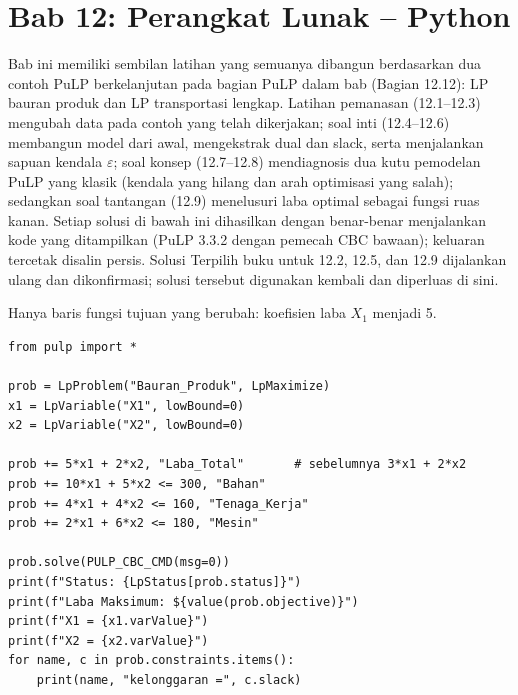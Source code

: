 
\section{Bab 12: Perangkat Lunak -- Python}

Bab ini memiliki sembilan latihan yang semuanya dibangun berdasarkan dua
contoh PuLP berkelanjutan pada bagian PuLP dalam bab (Bagian 12.12): LP bauran
produk dan LP transportasi lengkap. Latihan pemanasan (12.1--12.3) mengubah
data pada contoh yang telah dikerjakan; soal inti (12.4--12.6) membangun model
dari awal, mengekstrak dual dan slack, serta menjalankan sapuan kendala
$\varepsilon$; soal konsep (12.7--12.8) mendiagnosis dua kutu pemodelan PuLP
yang klasik (kendala yang hilang dan arah optimisasi yang salah); sedangkan
soal tantangan (12.9) menelusuri laba optimal sebagai fungsi ruas kanan.
Setiap solusi di bawah ini dihasilkan dengan benar-benar menjalankan kode yang
ditampilkan (PuLP 3.3.2 dengan pemecah CBC bawaan); keluaran tercetak disalin
persis. Solusi Terpilih buku untuk 12.2, 12.5, dan 12.9 dijalankan ulang dan
dikonfirmasi; solusi tersebut digunakan kembali dan diperluas di sini.


Hanya baris fungsi tujuan yang berubah: koefisien laba $X_1$ menjadi 5.

\begin{verbatim}
from pulp import *

prob = LpProblem("Bauran_Produk", LpMaximize)
x1 = LpVariable("X1", lowBound=0)
x2 = LpVariable("X2", lowBound=0)

prob += 5*x1 + 2*x2, "Laba_Total"       # sebelumnya 3*x1 + 2*x2
prob += 10*x1 + 5*x2 <= 300, "Bahan"
prob += 4*x1 + 4*x2 <= 160, "Tenaga_Kerja"
prob += 2*x1 + 6*x2 <= 180, "Mesin"

prob.solve(PULP_CBC_CMD(msg=0))
print(f"Status: {LpStatus[prob.status]}")
print(f"Laba Maksimum: ${value(prob.objective)}")
print(f"X1 = {x1.varValue}")
print(f"X2 = {x2.varValue}")
for name, c in prob.constraints.items():
    print(name, "kelonggaran =", c.slack)
\end{verbatim}

